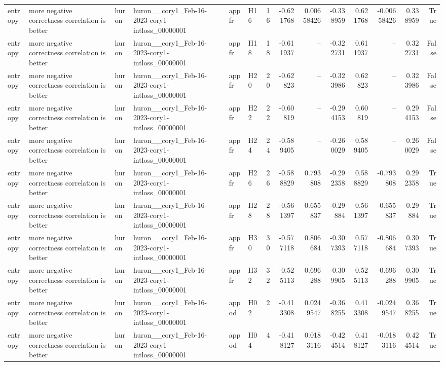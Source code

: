 \begin{longtable}{llllllrrrrrrrr}
entropy & more negative correctness correlation is better & huron & huron\_\_cory1\_Feb-16-2023-cory1-intloss\_00000001 & appfr & H16 & 16 & -0.621768 & 0.00658426 & -0.338959 & 0.621768 & -0.00658426 & 0.338959 & True \\
entropy & more negative correctness correlation is better & huron & huron\_\_cory1\_Feb-16-2023-cory1-intloss\_00000001 & appfr & H18 & 18 & -0.611937 & -- & -0.322731 & 0.611937 & -- & 0.322731 & False \\
entropy & more negative correctness correlation is better & huron & huron\_\_cory1\_Feb-16-2023-cory1-intloss\_00000001 & appfr & H20 & 20 & -0.62823 & -- & -0.323986 & 0.62823 & -- & 0.323986 & False \\
entropy & more negative correctness correlation is better & huron & huron\_\_cory1\_Feb-16-2023-cory1-intloss\_00000001 & appfr & H22 & 22 & -0.60819 & -- & -0.294153 & 0.60819 & -- & 0.294153 & False \\
entropy & more negative correctness correlation is better & huron & huron\_\_cory1\_Feb-16-2023-cory1-intloss\_00000001 & appfr & H24 & 24 & -0.589405 & -- & -0.260029 & 0.589405 & -- & 0.260029 & False \\
entropy & more negative correctness correlation is better & huron & huron\_\_cory1\_Feb-16-2023-cory1-intloss\_00000001 & appfr & H26 & 26 & -0.588829 & 0.793808 & -0.292358 & 0.588829 & -0.793808 & 0.292358 & True \\
entropy & more negative correctness correlation is better & huron & huron\_\_cory1\_Feb-16-2023-cory1-intloss\_00000001 & appfr & H28 & 28 & -0.561397 & 0.655837 & -0.29884 & 0.561397 & -0.655837 & 0.29884 & True \\
entropy & more negative correctness correlation is better & huron & huron\_\_cory1\_Feb-16-2023-cory1-intloss\_00000001 & appfr & H30 & 30 & -0.577118 & 0.806684 & -0.307393 & 0.577118 & -0.806684 & 0.307393 & True \\
entropy & more negative correctness correlation is better & huron & huron\_\_cory1\_Feb-16-2023-cory1-intloss\_00000001 & appfr & H32 & 32 & -0.525113 & 0.696288 & -0.309905 & 0.525113 & -0.696288 & 0.309905 & True \\
entropy & more negative correctness correlation is better & huron & huron\_\_cory1\_Feb-16-2023-cory1-intloss\_00000001 & appod & H02 & 2 & -0.413308 & 0.0249547 & -0.368255 & 0.413308 & -0.0249547 & 0.368255 & True \\
entropy & more negative correctness correlation is better & huron & huron\_\_cory1\_Feb-16-2023-cory1-intloss\_00000001 & appod & H04 & 4 & -0.418127 & 0.0183116 & -0.424514 & 0.418127 & -0.0183116 & 0.424514 & True \\

\end{longtable}
